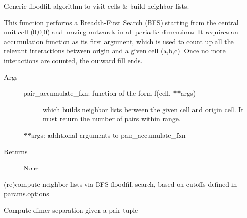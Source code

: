 \documentclass[letterpaper,10pt,english]{sphinxmanual}
\begin{document}
\begin{fulllineitems}
\label{\detokenize{globals:Globals.neighbor.BFS_lattice_traversal}}
Generic floodfill algorithm to visit cells \& build neighbor lists.

This function performs a Breadth-First Search (BFS) starting from the
central unit cell (0,0,0) and moving outwards in all periodic dimensions.
It requires an accumulation function as its first argument, which is used
to count up all the relevant interactions between origin and a given cell
(a,b,c). Once no more interactions are counted, the outward fill ends.
\begin{description}
\item[{Args}] \leavevmode\begin{description}
\item[{pair\_accumulate\_fxn: function of the form f(cell, {\color{red}\bfseries{}**}args)}] \leavevmode
which builds neighbor lists between the given cell and origin
cell.  It must return the number of pairs within range.

\end{description}

{\color{red}\bfseries{}**}args: additional arguments to pair\_accumulate\_fxn

\item[{Returns}] \leavevmode
None

\end{description}

\end{fulllineitems}


\begin{fulllineitems}
\label{\detokenize{globals:Globals.neighbor.build_lists}}
(re)compute neighbor lists via BFS floodfill search, based on cutoffs
defined in params.options

\end{fulllineitems}


\begin{fulllineitems}
\label{\detokenize{globals:Globals.neighbor.pair_dist}}
Compute dimer separation given a pair tuple

\end{fulllineitems}
\end{document}
